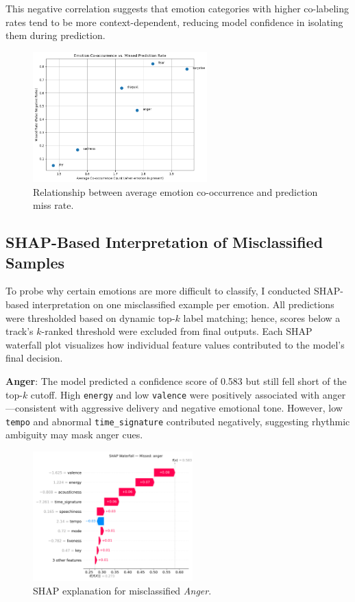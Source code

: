 \documentclass{article}
\begin{document}
This negative correlation suggests that emotion categories with higher co-labeling rates tend to be more context-dependent, reducing model confidence in isolating them during prediction.

\begin{figure}[H]
\centering
\includegraphics[width=0.6\textwidth]{Graphics/Error Analysis/Emotion Co vs Missed Prediction Rate.png}
\caption{Relationship between average emotion co-occurrence and prediction miss rate.}
\label{fig:cooccur_missrate}
\end{figure}

\subsection{SHAP-Based Interpretation of Misclassified Samples}

To probe why certain emotions are more difficult to classify, I conducted SHAP-based interpretation on one misclassified example per emotion. All predictions were thresholded based on dynamic top-$k$ label matching; hence, scores below a track’s $k$-ranked threshold were excluded from final outputs. Each SHAP waterfall plot visualizes how individual feature values contributed to the model’s final decision.

\textbf{Anger}: The model predicted a confidence score of 0.583 but still fell short of the top-$k$ cutoff. High \texttt{energy} and low \texttt{valence} were positively associated with anger—consistent with aggressive delivery and negative emotional tone. However, low \texttt{tempo} and abnormal \texttt{time\_signature} contributed negatively, suggesting rhythmic ambiguity may mask anger cues.

\begin{figure}[H]
\centering
\includegraphics[width=0.55\textwidth]{Graphics/shap_missed_labels/anger_missed_shap_waterfall.png}
\caption{SHAP explanation for misclassified \textit{Anger}.}
\label{fig:shap_anger}
\end{figure}
\end{document}
